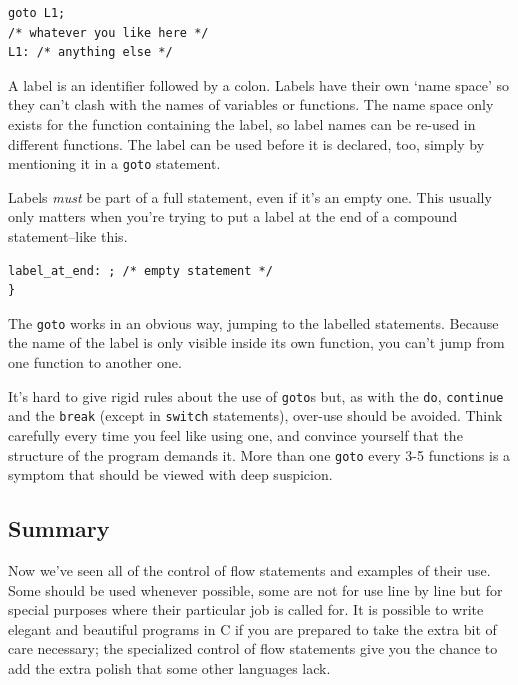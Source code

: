    \begin{Verbatim}
goto L1;
/* whatever you like here */
L1: /* anything else */
\end{Verbatim}

   A label is an identifier followed by a colon. Labels have their own
    `name space' so they can't clash with the names of variables or
    functions. The name space only exists for the function containing the
    label, so label names can be re-used in different functions. The label can
    be used before it is declared, too, simply by mentioning it in a
    \texttt{goto} statement.


   Labels \textit{must} be part of a full statement, even if it's an empty
    one. This usually only matters when you're trying to put a label at the
    end of a compound statement--like this.


   \begin{Verbatim}
label_at_end: ; /* empty statement */
}
\end{Verbatim}

   The \texttt{goto} works in an obvious way, jumping to the labelled
    statements. Because the name of the label is only visible inside its own
    function, you can't jump from one function to another one.


   It's hard to give rigid rules about the use of \texttt{goto}s but,
    as with the \texttt{do}, \texttt{continue} and the
    \texttt{break} (except in \texttt{switch} statements), over-use
    should be avoided. Think carefully every time you feel like using one, and
    convince yourself that the structure of the program demands it. More than
    one \texttt{goto} every 3-5 functions is a symptom that should
    be viewed with deep suspicion.


  

  \subsection{Summary}

   Now we've seen all of the control of flow statements and examples of
    their use. Some should be used whenever possible, some are not for use
    line by line but for special purposes where their particular job is called
    for. It is possible to write elegant and beautiful programs in C if you
    are prepared to take the extra bit of care necessary; the specialized
    control of flow statements give you the chance to add the extra polish
    that some other languages lack.



